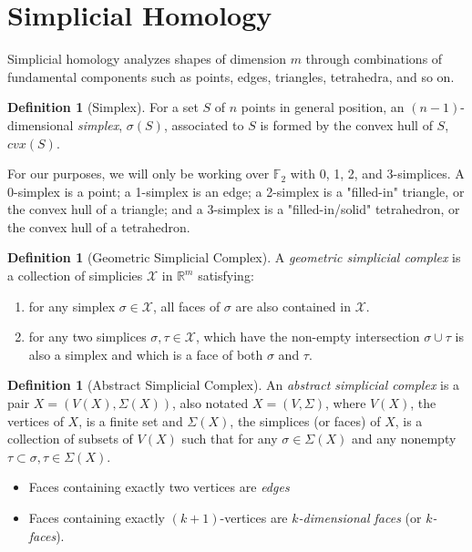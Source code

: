 \documentclass[ma]{uncgdissertationexp}
\theoremstyle{plain}
\theoremstyle{definition}
\newtheorem{definition}[theorem]{Definition}
\theoremstyle{remark}
\begin{document}
\section{Simplicial Homology}

\par Simplicial homology analyzes shapes of dimension $m$ through combinations of fundamental components such as points, edges, triangles, tetrahedra, and so on.

\begin{definition}[Simplex]
\par For a set $S$ of $n$ points in general position, an $(n-1)$-dimensional \textit{simplex}, $\sigma(S)$, associated to $S$ is formed by the convex hull of $S$, $cvx(S)$.
\end{definition}

\par For our purposes, we will only be working over $\mathbb{F}_2$ with 0, 1, 2, and 3-simplices. A 0-simplex is a point; a 1-simplex is an edge; a 2-simplex is a "filled-in" triangle, or the convex hull of a triangle; and a 3-simplex is a "filled-in/solid" tetrahedron, or the convex hull of a tetrahedron.

\begin{definition}[Geometric Simplicial Complex]
\par A \textit{geometric simplicial complex} is a collection of simplicies $\mathcal{X}$ in $\mathbb{R}^m$ satisfying:
\begin{enumerate}
\item for any simplex $\sigma \in \mathcal{X}$, all faces of $\sigma$ are also contained in $\mathcal{X}$.
\item for any two simplices $\sigma, \tau \in \mathcal{X}$, which have the non-empty intersection $\sigma \cup \tau$ is also a simplex and which is a face of both $
\sigma$ and $\tau$. 
\end{enumerate}
\end{definition}

\begin{definition}[Abstract Simplicial Complex]
\par An \textit{abstract simplicial complex} is a pair $X = (V(X), \Sigma(X))$, also notated $X=(V,\Sigma)$, where $V(X)$, the vertices of $X$, is a finite set and $\Sigma(X)$, the simplices (or faces) of $X$, is a collection of subsets of $V(X)$ such that for any $\sigma \in \Sigma(X)$ and any nonempty $\tau \subset \sigma, \tau \in \Sigma(X)$.
\begin{itemize}
\item Faces containing exactly two vertices are \textit{edges}
\item Faces containing exactly $(k+1)$-vertices are $k$\textit{-dimensional faces} (or $k$\textit{-faces}).
\end{itemize}
\end{definition}
\end{document}

